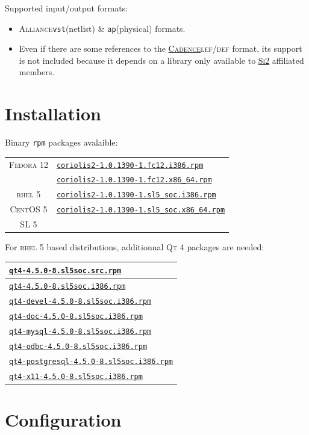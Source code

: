 \documentclass[11pt]{article}
\newcommand {\crlFtpUrl}    [1] {http://asim.lip6.fr/pub/coriolis/2.0/#1}
\newcommand {\slSocSrpmsUrl}[1] {http://ftp.lip6.fr/pub/linux/distributions/slsoc/5x/i386/SLSoC/SRPMS/#1}
\newcommand {\slRpmsUrl}    [1] {http://ftp.lip6.fr/pub/linux/distributions/slsoc/5x/i386/i386/SL/#1}
\newcommand{\xhref}        [2]{\href{#2}{#1}}
\newcommand{\crlFtpRef}    [1]{\href{\crlFtpUrl{#1}}{\texttt{\footnotesize #1}}}
\newcommand{\slSocSrpmsRef}[1]{\href{\slSocSrpmsUrl{#1}}{\texttt{\footnotesize #1}}}
\newcommand{\slRpmsRef}    [1]{\href{\slRpmsUrl{#1}}{\texttt{\footnotesize #1}}}
\newcommand{\xhref}        [2]{\htmladdnormallink{#1}{#2}}
\newcommand{\crlFtpRef}    [1]{\htmladdnormallink{#1}{\crlFtpUrl{#1}}}
\newcommand{\slSocSrpmsRef}[1]{\htmladdnormallink{#1}{\slSocSrpmsUrl{#1}}}
\newcommand{\slRpmsRef}    [1]{\htmladdnormallink{#1}{\slRpmsUrl{#1}}}
\newcommand {\SiII}               {\xhref{\textsc{Si2}}{http://www.si2.org/}\xspace}
\newcommand {\Cadence}            {\xhref{\textsc{Cadence}}{http://www.cadence.com/}\xspace}
\newcommand {\LEFDEF}             {\textsc{lef/def}\xspace}
\newcommand {\RHELV}              {\textsc{rhel 5}\xspace}
\newcommand {\CentOSV}            {\textsc{CentOS 5}\xspace}
\newcommand {\SLV}                {\textsc{SL 5}\xspace}
\newcommand {\FedoraXII}          {\textsc{Fedora 12}\xspace}
\newcommand {\QtIV}               {\textsc{Qt 4}\xspace}
\newcommand {\rpm}                {\texttt{rpm}\xspace}
\newcommand {\Alliance}           {\textsc{Alliance}\xspace}
\newcommand {\vst}                {\texttt{vst}\xspace}
\newcommand {\ap}                 {\texttt{ap}\xspace}
\newcommand {\coriolisIIfcXIIirpm}{\crlFtpRef{coriolis2-1.0.1390-1.fc12.i386.rpm}\xspace}
\newcommand {\coriolisIIfcXIIxrpm}{\crlFtpRef{coriolis2-1.0.1390-1.fc12.x86\_64.rpm}\xspace}
\newcommand {\coriolisIIslVirpm}  {\crlFtpRef{coriolis2-1.0.1390-1.sl5\_soc.i386.rpm}\xspace}
\newcommand {\coriolisIIslVxrpm}  {\crlFtpRef{coriolis2-1.0.1390-1.sl5\_soc.x86\_64.rpm}\xspace}
\newcommand {\qtIVsrpm}           {\slSocSrpmsRef{qt4-4.5.0-8.sl5soc.src.rpm}\xspace}
\newcommand {\qtIVirpm}           {\slRpmsRef{qt4-4.5.0-8.sl5soc.i386.rpm}\xspace}
\newcommand {\qtIVdevelirpm}      {\slRpmsRef{qt4-devel-4.5.0-8.sl5soc.i386.rpm}\xspace}
\newcommand {\qtIVdocirpm}        {\slRpmsRef{qt4-doc-4.5.0-8.sl5soc.i386.rpm}\xspace}
\newcommand {\qtIVmysqlirpm}      {\slRpmsRef{qt4-mysql-4.5.0-8.sl5soc.i386.rpm}\xspace}
\newcommand {\qtIVodbcirpm}       {\slRpmsRef{qt4-odbc-4.5.0-8.sl5soc.i386.rpm}\xspace}
\newcommand {\qtIVpostgresqlirpm} {\slRpmsRef{qt4-postgresql-4.5.0-8.sl5soc.i386.rpm}\xspace}
\newcommand {\qtIVxXIirpm}        {\slRpmsRef{qt4-x11-4.5.0-8.sl5soc.i386.rpm}\xspace}
\begin{document}
 \noindent Supported input/output formats:
 \begin{itemize}
   \item \Alliance \vst (netlist) \& \ap (physical) formats.
   \item Even if there are some references to the \Cadence \LEFDEF format, its
         support is not included because it depends on a library only available
         to \SiII affiliated members.
 \end{itemize}


 \section{Installation}

 Binary \rpm packages avalaible:
 \begin{center}
 \begin{tabular}{|c|l|}
   \hline
   \FedoraXII & \coriolisIIfcXIIirpm  \\
              & \coriolisIIfcXIIxrpm  \\
   \hline
   \RHELV     & \coriolisIIslVirpm  \\
   \CentOSV   & \coriolisIIslVxrpm  \\
   \SLV       &                     \\
   \hline
 \end{tabular}
 \end{center}
 For \RHELV based distributions, additionnal \QtIV packages are needed:

 \begin{center}
 \begin{tabular}{|l|}
   \hline
   \qtIVsrpm           \\
   \hline
   \hline
   \qtIVirpm           \\
   \qtIVdevelirpm      \\
   \qtIVdocirpm        \\
   \qtIVmysqlirpm      \\
   \qtIVodbcirpm       \\
   \qtIVpostgresqlirpm \\
   \qtIVxXIirpm        \\
   \hline
 \end{tabular}
 \end{center}

 \section{Configuration}
\end{document}
